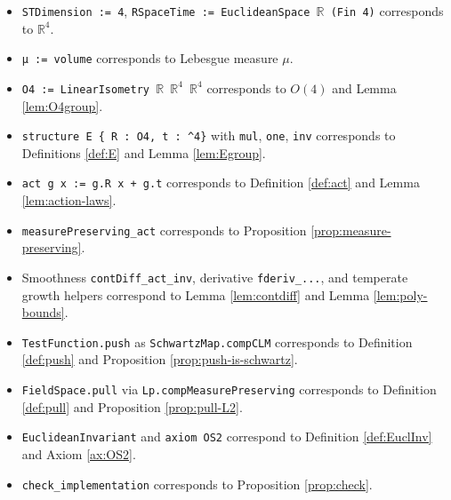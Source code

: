 \documentclass{article}
\newcommand{\R}{\mathbb{R}}
\newcommand{\Rd}{\mathbb{R}^4}
\newcommand{\1}{\mathbbm{1}}
\theoremstyle{plain}
\theoremstyle{definition}
\numberwithin{equation}{section}
\begin{document}
\begin{itemize}
\item \texttt{STDimension := 4}, \texttt{RSpaceTime := EuclideanSpace $\R$ (Fin 4)} corresponds to $\Rd$.
\item \texttt{μ := volume} corresponds to Lebesgue measure $\mu$.
\item \texttt{O4 := LinearIsometry $\R$ $\Rd$ $\Rd$} corresponds to $O(4)$ and Lemma \ref{lem:O4group}.
\item \texttt{structure E \{ R : O4, t : \Rd\}} with \texttt{mul}, \texttt{one}, \texttt{inv} corresponds to Definitions \ref{def:E} and Lemma \ref{lem:Egroup}.
\item \texttt{act g x := g.R x + g.t} corresponds to Definition \ref{def:act} and Lemma \ref{lem:action-laws}.
\item \texttt{measurePreserving\_act} corresponds to Proposition \ref{prop:measure-preserving}.
\item Smoothness \texttt{contDiff\_act\_inv}, derivative \texttt{fderiv\_...}, and temperate growth helpers correspond to Lemma \ref{lem:contdiff} and Lemma \ref{lem:poly-bounds}.
\item \texttt{TestFunction.push} as \texttt{SchwartzMap.compCLM} corresponds to Definition \ref{def:push} and Proposition \ref{prop:push-is-schwartz}.
\item \texttt{FieldSpace.pull} via \texttt{Lp.compMeasurePreserving} corresponds to Definition \ref{def:pull} and Proposition \ref{prop:pull-L2}.
\item \texttt{EuclideanInvariant} and \texttt{axiom OS2} correspond to Definition \ref{def:EuclInv} and Axiom \ref{ax:OS2}.
\item \texttt{check\_implementation} corresponds to Proposition \ref{prop:check}.
\end{itemize}




\end{document}
